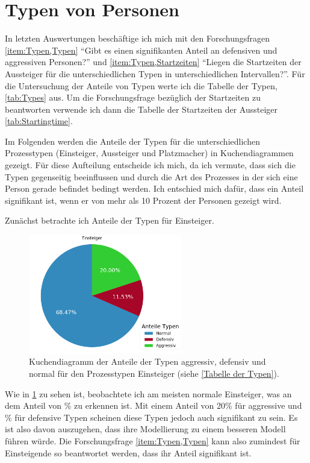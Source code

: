 \section{Typen von Personen} \label{Typen}
In letzten Auswertungen beschäftige ich mich mit den Forschungsfragen \ref{item:Typen,Typen} "`Gibt es einen signifikanten Anteil an defensiven und aggressiven Personen?"' und \ref{item:Typen,Startzeiten} "`Liegen die Startzeiten der Aussteiger für die unterschiedlichen Typen in unterschiedlichen Intervallen?"'. Für die Untersuchung der Anteile von Typen werte ich die Tabelle der Typen, \tablename \ref{tab:Types} aus. Um die Forschungsfrage bezüglich der Startzeiten zu beantworten verwende ich dann die Tabelle der Startzeiten der Aussteiger \tablename \ref{tab:Startingtime}.

Im Folgenden werden die Anteile der Typen für die unterschiedlichen Prozesstypen (Einsteiger, Aussteiger und Platzmacher) in Kuchendiagrammen gezeigt. Für diese Aufteilung entscheide ich mich, da ich vermute, dass sich die Typen gegenseitig beeinflussen und durch die Art des Prozesses in der sich eine Person gerade befindet bedingt werden. Ich entschied mich dafür, dass ein Anteil signifikant ist, wenn er von mehr als 10 Prozent der Personen gezeigt wird.

Zunächst betrachte ich Anteile der Typen für Einsteiger. 
\begin{figure}[H]
	\centering
		\includegraphics[width=0.6\textwidth]{pictures/data_evaluation/types/proportions_Einsteiger.png}
	\caption{Kuchendiagramm der Anteile der Typen aggressiv, defensiv und normal für den Prozesstypen Einsteiger (siehe \ref{Tabelle der Typen}).}
	\label{fig:AnteileTypenEinsteiger}
\end{figure}
Wie in \figurename \ref{fig:AnteileTypenEinsteiger} zu sehen ist, beobachtete ich am meisten normale Einsteiger, was an dem Anteil von  \% zu erkennen ist. Mit einem Anteil von 20\% für aggressive und \% für defensive Typen scheinen diese Typen jedoch auch signifikant zu sein. Es ist also davon auszugehen, dass ihre Modellierung zu einem besseren Modell führen würde. Die Forschungsfrage \ref{item:Typen,Typen} kann also zumindest für Einsteigende so beantwortet werden, dass ihr Anteil signifikant ist. 

